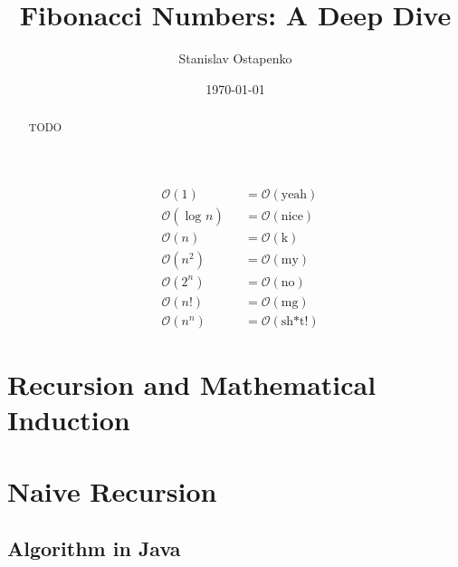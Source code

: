 \documentclass{article}
\newcommand{\sectionbreak}{\clearpage}
\begin{document}


\title{Fibonacci Numbers: A Deep Dive}
\author{Stanislav Ostapenko}
\date{\today}
\maketitle

\begin{abstract}
	TODO
\end{abstract}

\clearpage

	\tableofcontents %

	\clearpage
	
	\lstlistoflistings %

\clearpage %

\clearpage

	\thispagestyle{empty}

	\vspace*{\fill}
	\begin{center}
		\Huge
		\begin{align*}
			&   \mathcal{O}(1) &&= \mathcal{O}(\text{yeah})\\
			&    \mathcal{O}(\log_{} n) &&= \mathcal{O}(\text{nice})\\
			&    \mathcal{O}(n) &&= \mathcal{O}(\text{k})\\
			&    \mathcal{O}(n^{2}) &&= \mathcal{O}(\text{my})\\
			&    \mathcal{O}(2^{n}) &&= \mathcal{O}(\text{no})\\
			&    \mathcal{O}(n!) &&= \mathcal{O}(\text{mg})\\
			&    \mathcal{O}(n^{n}) &&= \mathcal{O}(\text{sh*t!})
		\end{align*}
	\end{center}
	\vspace*{\fill}

\clearpage

\newcommand{\sectionbreak}{\clearpage}
\section{Recursion and Mathematical Induction}
\section{Naive Recursion}
\subsection{Algorithm in Java}
\end{document}
